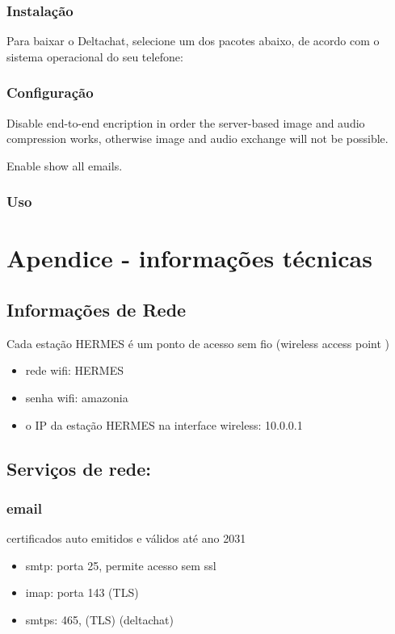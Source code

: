 \documentclass[11pt,a4paper]{article}
\begin{document}
\subsubsection{Instalação}

Para baixar o Deltachat, selecione um dos pacotes abaixo, de acordo com o sistema operacional do seu telefone:

\subsubsection{Configuração}

Disable end-to-end encription in order the server-based image and audio compression works, otherwise image and audio exchange will not be possible.

Enable show all emails.

\subsubsection{Uso}




\newpage
\section{Apendice - informações técnicas}
\subsection{Informações de Rede}

Cada estação HERMES é um ponto de acesso sem fio (wireless access point )
\begin{itemize}
\item rede wifi: HERMES
\item senha wifi: amazonia
\item o IP da estação HERMES na interface wireless: 10.0.0.1
\end{itemize}

\subsection{Serviços de rede:} 

\subsubsection{email} 
certificados auto emitidos e válidos até ano 2031
  \begin{itemize}
      \item   smtp: porta 25, permite acesso sem ssl
      \item  imap: porta 143 (TLS)
      \item  smtps: 465, (TLS)  (deltachat)
   \end{itemize}
  
\end{document}
